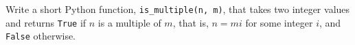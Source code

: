  \label{sssec:ex1_1}

Write a short Python function, \texttt{is\_multiple(n, m)}, that takes two integer values and returns \texttt{True} if $n$ is a multiple of $m$, that is, $n = mi$ for some integer $i$, and \texttt{False} otherwise.



